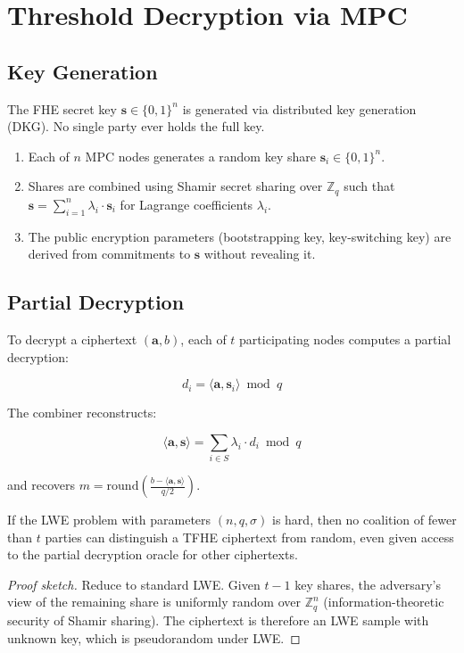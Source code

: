 \section{Threshold Decryption via MPC}


\subsection{Key Generation}

The FHE secret key $\mathbf{s} \in \{0,1\}^n$ is generated via distributed key generation (DKG). No single party ever holds the full key.

\begin{enumerate}[leftmargin=2em]
\item Each of $n$ MPC nodes generates a random key share $\mathbf{s}_i \in \{0,1\}^n$.
\item Shares are combined using Shamir secret sharing over $\mathbb{Z}_q$ such that $\mathbf{s} = \sum_{i=1}^{n} \lambda_i \cdot \mathbf{s}_i$ for Lagrange coefficients $\lambda_i$.
\item The public encryption parameters (bootstrapping key, key-switching key) are derived from commitments to $\mathbf{s}$ without revealing it.
\end{enumerate}

\subsection{Partial Decryption}

To decrypt a ciphertext $(\mathbf{a}, b)$, each of $t$ participating nodes computes a partial decryption:

$$d_i = \langle \mathbf{a}, \mathbf{s}_i \rangle \bmod q$$

The combiner reconstructs:

$$\langle \mathbf{a}, \mathbf{s} \rangle = \sum_{i \in S} \lambda_i \cdot d_i \bmod q$$

and recovers $m = \text{round}\left(\frac{b - \langle \mathbf{a}, \mathbf{s} \rangle}{q/2}\right)$.

\begin{theorem}
If the LWE problem with parameters $(n, q, \sigma)$ is hard, then no coalition of fewer than $t$ parties can distinguish a TFHE ciphertext from random, even given access to the partial decryption oracle for other ciphertexts.
\end{theorem}

\begin{proof}[Proof sketch]
Reduce to standard LWE. Given $t-1$ key shares, the adversary's view of the remaining share is uniformly random over $\mathbb{Z}_q^n$ (information-theoretic security of Shamir sharing). The ciphertext is therefore an LWE sample with unknown key, which is pseudorandom under LWE.
\end{proof}

